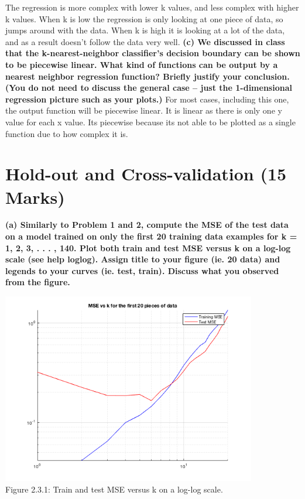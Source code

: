 \documentclass[]{scrreprt}   %
\begin{document}
\bigbreak
{The regression is more complex with lower k values, and less complex with higher k values. When k is low the regression is only looking at one piece of data, so jumps around with the data. When k is high it is looking at a lot of the data, and as a result doesn't follow the data very well. }
\bigbreak
\textbf{(c) We discussed in class that the k-nearest-neighbor classifier’s decision boundary can be shown to be piecewise linear. What kind of functions can be output by a nearest neighbor regression function? Briefly justify your conclusion. (You do not need to discuss the general case – just the 1-dimensional regression picture such as your plots.)}
\bigbreak
{For most cases, including this one, the output function will be piecewise linear. It is linear as there is only one y value for each x value. Its piecewise because its not able to be plotted as a single function due to how complex it is.}

\section{Hold-out and Cross-validation (15 Marks)}
\textbf{(a) Similarly to Problem 1 and 2, compute the MSE of the test data on a model trained on only the first 20 training data examples for k = 1, 2, 3, . . . , 140. Plot both train and test MSE versus k on a log-log scale (see help loglog). Assign title to your figure (ie. 20 data) and legends to your curves (ie. test, train). Discuss what you observed from the figure.}

\begin{center}
	\includegraphics[width=30em,keepaspectratio]{p3figure1.png}\\
	{Figure 2.3.1: Train and test MSE versus k on a log-log scale.}
\end{center} 
\end{document}
